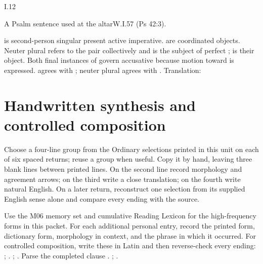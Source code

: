 \begin{courseunit}{I.12}
\begin{workedexample}{A Psalm sentence used at the altar}{W.I.57}
 (Ps 42:3).

 is second-person singular present active imperative.
 are coordinated objects. Neuter plural
 refers to the pair collectively and is the subject of perfect
;  is their object. Both final
instances of  govern accusative because motion toward is expressed.
 agrees with ; neuter plural 
agrees with . Translation: 
\end{workedexample}

\section{Handwritten synthesis and controlled composition}

Choose a four-line group from the Ordinary selections printed in this unit on
each of six spaced returns; reuse a group when useful. Copy it by hand, leaving
three blank lines between printed lines. On the second line
record morphology and agreement arrows; on the third write a close
translation; on the fourth write natural English. On a later return,
reconstruct one selection from its supplied English sense alone and compare
every ending with the source.

Use the M06 memory set and cumulative Reading Lexicon for the high-frequency
forms in this packet. For each additional personal entry, record the printed
form, dictionary form, morphology in context, and the phrase in which it
occurred. For controlled composition, write these in Latin and then
reverse-check every ending: ;
. ; . Parse the completed clause
. ; .

\end{courseunit}
